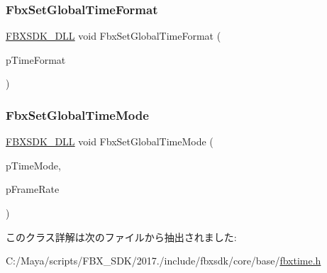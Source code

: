 \mbox{\label{class_fbx_time_a765fa4f060e2aaca17ba5d41ddb72b1f}} 
\subsubsection{\texorpdfstring{Fbx\+Set\+Global\+Time\+Format}{FbxSetGlobalTimeFormat}}
{\footnotesize\ttfamily \hyperlink{fbxarch_8h_a25d1298b33c31da5dbed969e0d4b4bc1}{F\+B\+X\+S\+D\+K\+\_\+\+D\+LL} void Fbx\+Set\+Global\+Time\+Format (\begin{DoxyParamCaption}\item[{\hyperlink{class_fbx_time_a10ffa1fdce0aa7f63ec24bdd23afff4b}{Fbx\+Time\+::\+E\+Protocol}}]{p\+Time\+Format }\end{DoxyParamCaption})\hspace{0.3cm}{\ttfamily [friend]}}

\mbox{\label{class_fbx_time_a8d274550abe4c6890b2fa0da734f6530}} 
\subsubsection{\texorpdfstring{Fbx\+Set\+Global\+Time\+Mode}{FbxSetGlobalTimeMode}}
{\footnotesize\ttfamily \hyperlink{fbxarch_8h_a25d1298b33c31da5dbed969e0d4b4bc1}{F\+B\+X\+S\+D\+K\+\_\+\+D\+LL} void Fbx\+Set\+Global\+Time\+Mode (\begin{DoxyParamCaption}\item[{\hyperlink{class_fbx_time_acc529b00a0e8d4c3da3702449ca93031}{Fbx\+Time\+::\+E\+Mode}}]{p\+Time\+Mode,  }\item[{double}]{p\+Frame\+Rate }\end{DoxyParamCaption})\hspace{0.3cm}{\ttfamily [friend]}}



このクラス詳解は次のファイルから抽出されました\+:\begin{DoxyCompactItemize}
\item 
C\+:/\+Maya/scripts/\+F\+B\+X\+\_\+\+S\+D\+K/2017./include/fbxsdk/core/base/\hyperlink{fbxtime_8h}{fbxtime.\+h}\end{DoxyCompactItemize}
